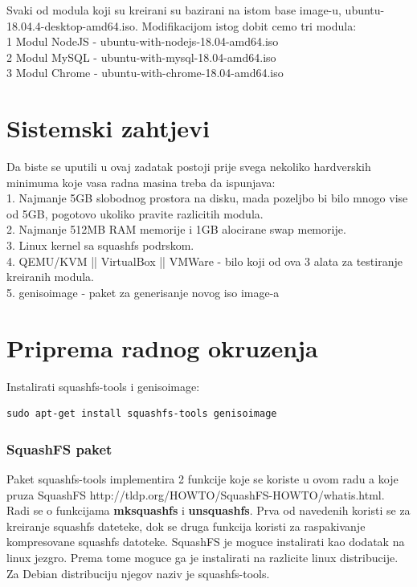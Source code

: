 \documentclass[12pt,vi]{mitthesis}
\begin{document}
Svaki od modula koji su kreirani su bazirani na istom base image-u, ubuntu-18.04.4-desktop-amd64.iso. Modifikacijom istog dobit cemo tri modula:\\ 
1 Modul NodeJS - ubuntu-with-nodejs-18.04-amd64.iso\\
2 Modul MySQL - ubuntu-with-mysql-18.04-amd64.iso\\
3 Modul Chrome - ubuntu-with-chrome-18.04-amd64.iso\\

\chapter*{Sistemski zahtjevi}
Da biste se uputili u ovaj zadatak postoji prije svega nekoliko hardverskih minimuma koje vasa radna masina treba da ispunjava:\\

1. Najmanje 5GB slobodnog prostora na disku, mada pozeljbo bi bilo mnogo vise od 5GB, pogotovo ukoliko pravite razlicitih modula.\\
2. Najmanje 512MB RAM memorije i 1GB alocirane swap memorije.\\
3. Linux kernel sa squashfs podrskom.\\
4. QEMU/KVM || VirtualBox || VMWare - bilo koji od ova 3 alata za testiranje kreiranih modula.\\
5. genisoimage - paket za generisanje novog iso image-a\\

\chapter*{Priprema radnog okruzenja}
Instalirati squashfs-tools i genisoimage:
\begin{lstlisting}[style=BashInputStyle]
sudo apt-get install squashfs-tools genisoimage
\end{lstlisting}

\subsection*{SquashFS paket}
Paket squashfs-tools implementira 2 funkcije koje se koriste u ovom radu a koje pruza SquashFS http://tldp.org/HOWTO/SquashFS-HOWTO/whatis.html.
Radi se o funkcijama \textbf{mksquashfs} i \textbf{unsquashfs}. Prva od navedenih koristi se za kreiranje squashfs dateteke, dok se druga funkcija koristi za raspakivanje kompresovane squashfs datoteke.
SquashFS je moguce instalirati kao dodatak na linux jezgro. Prema tome moguce ga je instalirati na razlicite linux distribucije. Za Debian distribuciju njegov naziv je squashfs-tools.
\end{document}
